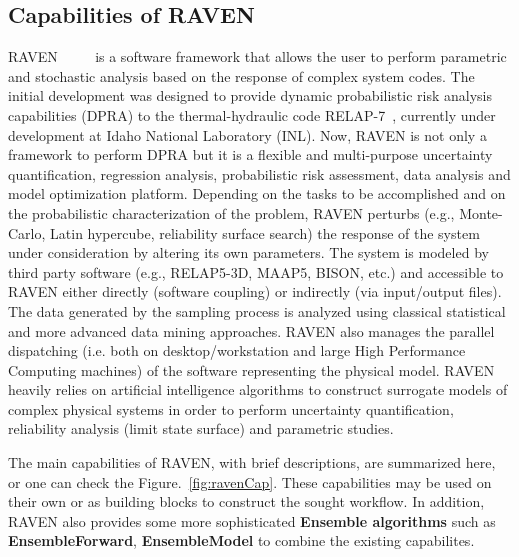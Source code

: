 

\subsection{Capabilities of RAVEN}
RAVEN~\cite{alfonsiMC} ~\cite{alfonsiPSA}~\cite{RAVENFY13}~\cite{ESREL2014} is a software framework that allows the user to perform parametric and stochastic
analysis based on the response of complex system codes.
The initial development was designed to provide dynamic probabilistic risk analysis
capabilities (DPRA) to the thermal-hydraulic code RELAP-7~\cite{relap7FY12}, currently under development
at Idaho National Laboratory (INL).
Now, RAVEN is not only a framework to perform DPRA but it is a flexible and
multi-purpose uncertainty quantification, regression analysis, probabilistic risk assessment, data analysis and
model optimization platform. Depending on the tasks to be accomplished and on the probabilistic characterization
of the problem, RAVEN perturbs (e.g., Monte-Carlo, Latin hypercube, reliability surface search) the response of
the system under consideration by altering its own parameters. The system is modeled by third party software
(e.g., RELAP5-3D, MAAP5, BISON, etc.) and accessible to RAVEN either directly (software coupling) or indirectly
(via input/output files). The data generated by the sampling process is analyzed using classical statistical
and more advanced data mining approaches. RAVEN also manages the parallel dispatching
(i.e. both on desktop/workstation and large High Performance Computing machines) of the software representing the
physical model. RAVEN heavily relies on artificial intelligence algorithms to construct surrogate models of
complex physical systems in order to perform uncertainty quantification, reliability analysis (limit state surface)
and parametric studies.

The main capabilities of RAVEN, with brief descriptions, are summarized here, or one can check the Figure.~\ref{fig:ravenCap}.
These capabilities may be used on their own or as building blocks to construct the sought workflow. In addition, RAVEN also provides some more sophisticated
\textbf{Ensemble algorithms} such as \textbf{EnsembleForward}, \textbf{EnsembleModel} to combine the existing
capabilites.

